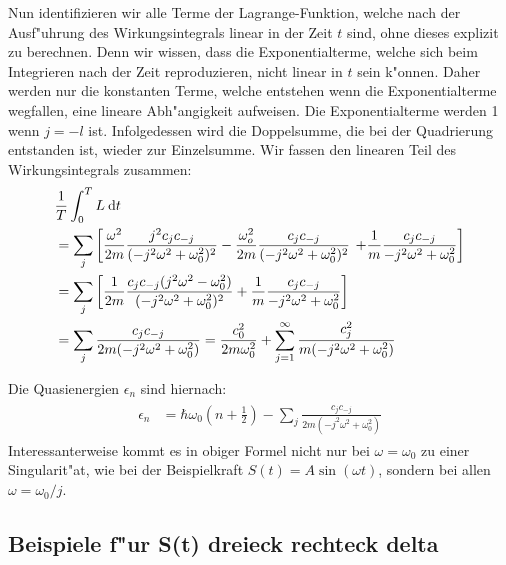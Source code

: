    Nun identifizieren wir alle Terme der Lagrange-Funktion, welche nach der Ausf"uhrung des Wirkungsintegrals linear in der Zeit $t$ sind, ohne dieses explizit zu berechnen.
   Denn wir wissen, dass die Exponentialterme, welche sich beim Integrieren nach der Zeit reproduzieren, nicht linear in $t$ sein k"onnen.
   Daher werden nur die konstanten Terme, welche entstehen wenn die Exponentialterme wegfallen, eine lineare Abh"angigkeit aufweisen.
   Die Exponentialterme werden 1 wenn $j=-l$ ist.
   Infolgedessen wird die Doppelsumme, die bei der Quadrierung entstanden ist, wieder zur Einzelsumme.
   Wir fassen den linearen Teil des Wirkungsintegrals zusammen:
   \begin{align}
     \begin{split}
       &\frac{1}{T} \int_0^T L \: \text d t \\
       &= \sum_j \left[\frac{\omega^2}{2m} \frac{j^2c_jc_{-j}}{(-j^2\omega^2+\omega_0^2)^2}
       - \frac{\omega_o^2}{2m} \frac{c_jc_{-j}}{(-j^2\omega^2+\omega_0^2)^2} \right.
       \left. +\frac{1}{m} \frac{c_jc_{-j}}{-j^2\omega^2+\omega_0^2}
       \right]\\
       &= \sum_j \left[\frac{1}{2m} \frac{c_jc_{-j}(j^2\omega^2-\omega_0^2)}{(-j^2\omega^2+\omega_0^2)^2} + \frac{1}{m} \frac{c_jc_{-j}}{-j^2\omega^2+\omega_0^2} \right] \\
       &= \sum_j \frac{c_jc_{-j}}{2m(-j^2\omega^2+\omega_0^2)} = \frac{c_0^2}{2m\omega_0^2} + \sum_{j=1}^\infty \frac{c_j^2}{m(-j^2\omega^2+\omega_0^2)}
     \end{split}
   \end{align}

   Die Quasienergien $\epsilon_n$ sind hiernach:
   \begin{align}
     \begin{split}
       \epsilon_n &= \hbar \omega_0(n+\frac{1}{2}) - \sum_j \frac{c_jc_{-j}}{2m(-j^2\omega^2+\omega_0^2)}
     \end{split}
   \end{align}
   Interessanterweise kommt es in obiger Formel nicht nur bei $\omega = \omega_0$ zu einer Singularit"at, wie bei der Beispielkraft $S(t) = A\sin(\omega t)$, sondern bei allen $\omega = \omega_0 / j$.



   \subsection{Beispiele f"ur S(t) dreieck rechteck delta}





